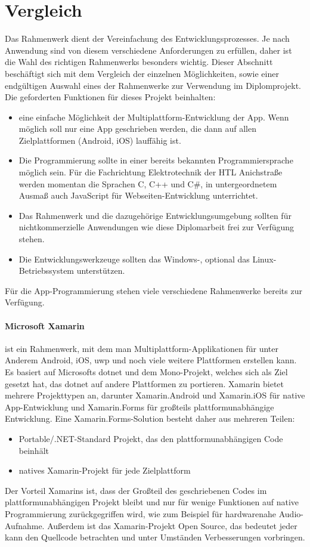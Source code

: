 \section{Vergleich}
Das Rahmenwerk dient der Vereinfachung des Entwicklungsprozesses.
Je nach Anwendung sind von diesem verschiedene Anforderungen zu erfüllen, daher ist die Wahl des richtigen Rahmenwerks besonders wichtig.
Dieser Abschnitt beschäftigt sich mit dem Vergleich der einzelnen Möglichkeiten, sowie einer endgültigen Auswahl eines der Rahmenwerke zur Verwendung im Diplomprojekt.
Die geforderten Funktionen für dieses Projekt beinhalten:
\begin{itemize}
    \item eine einfache Möglichkeit der Multiplattform-Entwicklung der App. Wenn möglich soll nur eine App geschrieben werden, die dann auf allen Zielplattformen (Android, iOS) lauffähig ist.
    \item Die Programmierung sollte in einer bereits bekannten Programmiersprache möglich sein.
    Für die Fachrichtung Elektrotechnik der HTL Anichstraße werden momentan die Sprachen C, C++ und C\#, in untergeordnetem Ausmaß auch JavaScript für Webseiten-Entwicklung unterrichtet.
    \item Das Rahmenwerk und die dazugehörige Entwicklungsumgebung sollten für nichtkommerzielle Anwendungen wie diese Diplomarbeit frei zur Verfügung stehen.
    \item Die Entwicklungswerkzeuge sollten das Windows-, optional das Linux-Betriebs\-sys\-tem unterstützen.
\end{itemize}

Für die App-Programmierung stehen viele verschiedene Rahmenwerke bereits zur Verfügung.
\paragraph{Microsoft Xamarin}
ist ein Rahmenwerk, mit dem man Multiplattform-Applikationen für unter Anderem Android, iOS, \ac{uwp} und noch viele weitere Plattformen erstellen kann.
Es basiert auf Microsofts \ac{dotnet} und dem Mono-Projekt, welches sich als Ziel gesetzt hat, das \ac{dotnet} auf andere Plattformen zu portieren.
Xamarin bietet mehrere Projekttypen an, darunter Xamarin.Android und Xamarin.iOS für native App-Entwicklung und Xamarin.Forms für großteils plattformunabhängige Entwicklung.
Eine Xamarin.Forms-Solution besteht daher aus mehreren Teilen:
\begin{itemize}
    \item Portable/.NET-Standard Projekt, das den plattformunabhängigen Code beinhält
    \item natives Xamarin-Projekt für jede Zielplattform
\end{itemize}
Der Vorteil Xamarins ist, dass der Großteil des geschriebenen Codes im plattformunabhängigen Projekt bleibt und nur für wenige Funktionen auf native Programmierung zurückgegriffen wird, wie zum Beispiel für hardwarenahe Audio-Aufnahme.
Außerdem ist das Xamarin-Projekt Open Source, das bedeutet jeder kann den Quellcode betrachten und unter Umständen Verbesserungen vorbringen.

